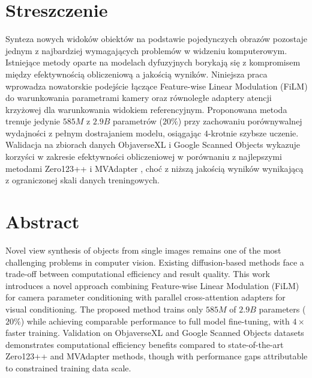 \section*{Streszczenie}

Synteza nowych widoków obiektów na podstawie pojedynczych obrazów pozostaje jednym z najbardziej wymagających problemów w widzeniu komputerowym. Istniejące metody oparte na modelach dyfuzyjnych borykają się z kompromisem między efektywnością obliczeniową a jakością wyników. Niniejsza praca wprowadza nowatorskie podejście łączące Feature-wise Linear Modulation (FiLM) do warunkowania parametrami kamery oraz równoległe adaptery atencji krzyżowej dla warunkowania widokiem referencyjnym.
Proponowana metoda trenuje jedynie $585M$ z $2.9B$ parametrów ($20\%$) przy zachowaniu porównywalnej wydajności z pełnym dostrajaniem modelu, osiągając $4$-krotnie szybsze uczenie. Walidacja na zbiorach danych ObjaverseXL \cite{objaversexl} i Google Scanned Objects \cite{gso} wykazuje korzyści w zakresie efektywności obliczeniowej w porównaniu z najlepszymi metodami Zero123++ \cite{zero1to3} i MVAdapter \cite{mvadapter}, choć z niższą jakością wyników wynikającą z ograniczonej skali danych treningowych.

\section*{Abstract}

Novel view synthesis of objects from single images remains one of the most challenging problems in computer vision. Existing diffusion-based methods face a trade-off between computational efficiency and result quality. This work introduces a novel approach combining Feature-wise Linear Modulation (FiLM) for camera parameter conditioning with parallel cross-attention adapters for visual conditioning.
The proposed method trains only $585M$ of $2.9B$ parameters ($20\%$) while achieving comparable performance to full model fine-tuning, with $4\times$ faster training. Validation on ObjaverseXL \cite{objaversexl} and Google Scanned Objects \cite{gso} datasets demonstrates computational efficiency benefits compared to state-of-the-art Zero123++ \cite{zero1to3} and MVAdapter \cite{mvadapter} methods, though with performance gaps attributable to constrained training data scale.
